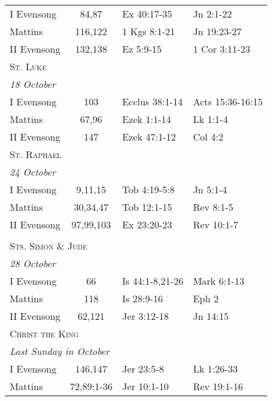 \begin{longtable}{l c l l}
\hspace{1em} I Evensong&84,87&Ex 40:17-35&Jn 2:1-22\\
\hspace{1em} Mattins&116,122&1 Kgs 8:1-21&Jn 19:23-27\\
\hspace{1em} II Evensong&132,138&Ez 5:9-15&1 Cor 3:11-23\\
%
\multicolumn{4}{l}{\textsc{St. Luke}}\\
\multicolumn{4}{l}{\textit{18 October}}\\
\hspace{1em} I Evensong&103&Ecclus 38:1-14&Acts 15:36-16:15\\
\hspace{1em} Mattins&67,96&Ezek 1:1-14&Lk 1:1-4\\
\hspace{1em} II Evensong&147&Ezek 47:1-12&Col 4:2\\
%
\multicolumn{4}{l}{\textsc{St. Raphael}}\\
\multicolumn{4}{l}{\textit{24 October}}\\
\hspace{1em} I Evensong&9,11,15&Tob 4:19-5:8&Jn 5:1-4\\
\hspace{1em} Mattins&30,34,47&Tob 12:1-15&Rev 8:1-5\\
\hspace{1em} II Evensong&97,99,103&Ex 23:20-23&Rev 10:1-7\\
%
\\
\multicolumn{4}{l}{\textsc{Sts. Simon \& Jude}}\\
\multicolumn{4}{l}{\textit{28 October}}\\
\hspace{1em} I Evensong&66&Is 44:1-8,21-26&Mark 6:1-13\\
\hspace{1em} Mattins&118&Is 28:9-16&Eph 2\\
\hspace{1em} II Evensong&62,121&Jer 3:12-18&Jn 14:15\\
\multicolumn{4}{l}{\textsc{Christ the King}}\\
\multicolumn{4}{l}{\textit{Last Sunday in October}}\\
\hspace{1em} I Evensong&146,147&Jer 23:5-8&Lk 1:26-33\\
\hspace{1em} Mattins&72,89:1-36&Jer 10:1-10&Rev 19:1-16\\

\end{longtable}
